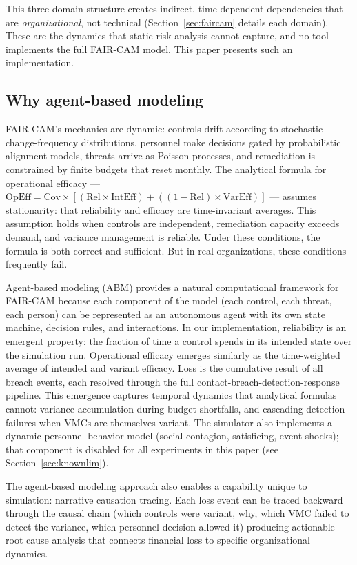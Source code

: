 \documentclass[11pt,a4paper]{article}
\begin{document}
This three-domain structure creates indirect, time-dependent dependencies that are \emph{organizational}, not technical (Section~\ref{sec:faircam} details each domain). These are the dynamics that static risk analysis cannot capture, and no tool implements the full FAIR-CAM model. This paper presents such an implementation.

\subsection{Why agent-based modeling}

FAIR-CAM's mechanics are dynamic: controls drift according to stochastic change-frequency distributions, personnel make decisions gated by probabilistic alignment models, threats arrive as Poisson processes, and remediation is constrained by finite budgets that reset monthly. The analytical formula for operational efficacy --- $\mathrm{OpEff} = \mathrm{Cov} \times [(\mathrm{Rel} \times \mathrm{IntEff}) + ((1-\mathrm{Rel}) \times \mathrm{VarEff})]$ --- assumes stationarity: that reliability and efficacy are time-invariant averages. This assumption holds when controls are independent, remediation capacity exceeds demand, and variance management is reliable. Under these conditions, the formula is both correct and sufficient. But in real organizations, these conditions frequently fail.

Agent-based modeling (ABM) provides a natural computational framework for FAIR-CAM because each component of the model (each control, each threat, each person) can be represented as an autonomous agent with its own state machine, decision rules, and interactions. In our implementation, reliability is an emergent property: the fraction of time a control spends in its intended state over the simulation run. Operational efficacy emerges similarly as the time-weighted average of intended and variant efficacy. Loss is the cumulative result of all breach events, each resolved through the full contact-breach-detection-response pipeline. This emergence captures temporal dynamics that analytical formulas cannot: variance accumulation during budget shortfalls, and cascading detection failures when VMCs are themselves variant. The simulator also implements a dynamic personnel-behavior model (social contagion, satisficing, event shocks); that component is disabled for all experiments in this paper (see Section~\ref{sec:knownlim}).

The agent-based modeling approach also enables a capability unique to simulation: narrative causation tracing. Each loss event can be traced backward through the causal chain (which controls were variant, why, which VMC failed to detect the variance, which personnel decision allowed it) producing actionable root cause analysis that connects financial loss to specific organizational dynamics.
\end{document}
